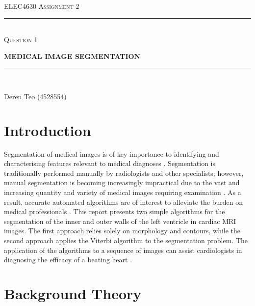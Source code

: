 \begin{titlepage}
  \centering

  \textsc{ELEC4630 Assignment 2}\\
  \vspace{9cm}

  \rule{\linewidth}{0.5pt}\\

  \vspace{1em}
  \LARGE\textsc{Question 1}\\
  \vspace{1em}

  \LARGE\uppercase{\textbf{{Medical Image Segmentation}}}\\

  \rule{\linewidth}{2pt}\\

  \vfill

  \normalsize{Deren Teo (4528554)}
  \vspace{1cm}

\end{titlepage}

\section{Introduction}

Segmentation of medical images is of key importance to identifying and characterising features relevant to medical diagnoses \cite{dinesh_2013}. Segmentation is traditionally performed manually by radiologists and other specialists; however, manual segmentation is becoming increasingly impractical due to the vast and increasing quantity and variety of medical images requiring examination \cite{dinesh_2013}. As a result, accurate automated algorithms are of interest to alleviate the burden on medical professionals \cite{dinesh_2013}. This report presents two simple algorithms for the segmentation of the inner and outer walls of the left ventricle in cardiac MRI images. The first approach relies solely on morphology and contours, while the second approach applies the Viterbi algorithm to the segmentation problem. The application of the algorithms to a sequence of images can assist cardiologists in diagnosing the efficacy of a beating heart \cite{elec4630_2023}.

\section{Background Theory}

